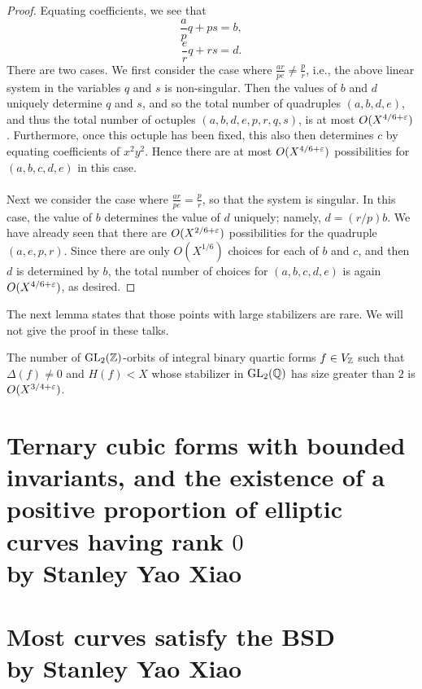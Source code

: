 \documentclass[12pt,amsfont]{amsart}
\begin{document}
\begin{proof}
Equating coefficients, we see that
\[\frac{a}{p} q + ps = b, \]
\[\frac{e}{r} q + rs = d.\]
There are two cases. We first consider the case where $\frac{ar}{pe} \ne \frac{p}{r}$, i.e., the above linear system in the variables $q$ and $s$ is non-singular. Then the values of $b$ and $d$ uniquely determine $q$ and $s$, and so the total number of quadruples $(a,b,d,e)$, and thus the total number of octuples $(a,b,d,e,p,r,q,s)$, is at most $O(X^{4/6+\varepsilon})$. Furthermore, once this octuple has been fixed, this also then determines $c$ by equating coefficients of $x^2 y^2$. Hence there are at most $O(X^{4/6 + \varepsilon})$ possibilities for $(a,b,c,d,e)$ in this case. \\ \\
Next we consider the case where $\frac{ar}{pe} = \frac{p}{r}$, so that the system is singular. In this case, the value of $b$ determines the value of $d$ uniquely; namely, $d = (r/p)b$. We have already seen that there are $O(X^{2/6 + \varepsilon})$ possibilities for the quadruple $(a,e,p,r)$. Since there are only $O(X^{1/6})$ choices for each of $b$ and $c$, and then $d$ is determined by $b$, the total number of choices for $(a,b,c,d,e)$ is again $O(X^{4/6 + \varepsilon})$, as desired.
\end{proof}

The next lemma states that those points with large stabilizers are rare. We will not give the proof in these talks.

\begin{lem} The number of $\operatorname{GL}_2({\mathbb Z})$-orbits of integral binary quartic forms $f \in V_{\mathbb Z}$ such that $\Delta(f) \ne 0$ and $H(f) < X$ whose stabilizer in $\operatorname{GL}_2({\mathbb Q})$ has size greater than $2$ is $O(X^{3/4 + \varepsilon})$. 
\end{lem}

\newpage
\section{Ternary cubic forms with bounded invariants, and the existence of a positive proportion of elliptic curves having rank $0$ \\ by Stanley Yao Xiao}

\newpage
\section{Most curves satisfy the BSD \\ by Stanley Yao Xiao}
\end{document}
